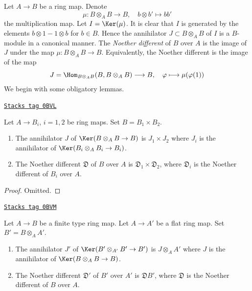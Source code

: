 \medskip\noindent
Let $A \to B$ be a ring map. Denote
$$
\mu : B \otimes_A B \longrightarrow B,\quad
b \otimes b' \longmapsto bb'
$$
the multiplication map. Let $I = \Ker(\mu)$. It is clear that $I$ is
generated by the elements $b \otimes 1 - 1 \otimes b$ for $b \in B$.
Hence the annihilator $J \subset B \otimes_A B$ of $I$ is a $B$-module
in a canonical manner. The {\it Noether different} of $B$ over $A$ is
the image of $J$ under the map $\mu : B \otimes_A B \to B$. Equivalently,
the Noether different is the image of the map
$$
J = \Hom_{B \otimes_A B}(B, B \otimes_A B) \longrightarrow B,\quad
\varphi \longmapsto \mu(\varphi(1))
$$
We begin with some obligatory lemmas.

\begin{lemma}
\label{discriminant-lemma-noether-different-product}
\href{https://stacks.math.columbia.edu/tag/0BVL}{\texttt{Stacks tag 0BVL}}

Let $A \to B_i$, $i = 1, 2$ be ring maps. Set $B = B_1 \times B_2$.
\begin{enumerate}
\item The annihilator $J$ of $\Ker(B \otimes_A B \to B)$ is $J_1 \times J_2$
where $J_i$ is the annihilator of $\Ker(B_i \otimes_A B_i \to B_i)$.
\item The Noether different $\mathfrak{D}$ of $B$ over $A$ is
$\mathfrak{D}_1 \times \mathfrak{D}_2$, where $\mathfrak{D}_i$ is
the Noether different of $B_i$ over $A$.
\end{enumerate}
\end{lemma}

\begin{proof}
Omitted.
\end{proof}

\begin{lemma}
\label{discriminant-lemma-noether-different-base-change}
\href{https://stacks.math.columbia.edu/tag/0BVM}{\texttt{Stacks tag 0BVM}}

Let $A \to B$ be a finite type ring map. Let $A \to A'$ be a flat ring map.
Set $B' = B \otimes_A A'$.
\begin{enumerate}
\item The annihilator $J'$ of $\Ker(B' \otimes_{A'} B' \to B')$ is
$J \otimes_A A'$ where $J$ is the annihilator of $\Ker(B \otimes_A B \to B)$.
\item The Noether different $\mathfrak{D}'$ of $B'$ over $A'$ is
$\mathfrak{D}B'$, where $\mathfrak{D}$ is
the Noether different of $B$ over $A$.
\end{enumerate}
\end{lemma}


